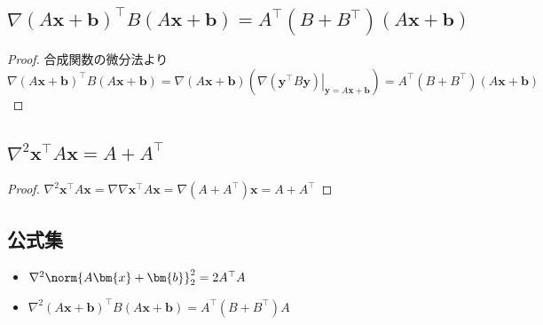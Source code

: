         \subsection{\texorpdfstring{$\nabla (A\bm{x}+\bm{b})^\top B(A\bm{x}+\bm{b}) = A^\top(B+B^\top)(A\bm{x}+\bm{b})$}{∇ (Ax+b)\string^⊤ B(Ax+b) = A\string^⊤ (B+B\string^⊤)(Ax+b)}}
            \begin{proof}
                \quad\par
                合成関数の微分法より
                \[ \nabla (A\bm{x}+\bm{b})^\top B(A\bm{x}+\bm{b}) = \nabla(A\bm{x} + \bm{b})\left(\left.\nabla(\bm{y}^\top B\bm{y})\right|_{\bm{y}=A\bm{x}+\bm{b}}\right) = A^\top(B+B^\top)(A\bm{x}+\bm{b}) \]
            \end{proof}
        \subsection{\texorpdfstring{$\nabla^2 \bm{x}^\top A\bm{x} = A+A^\top$}{∇\string^2 x\string^⊤ Ax = A+A\string^⊤}}
            \begin{proof}
                \quad $\nabla^2\bm{x}^\top A\bm{x} = \nabla \nabla\bm{x}^\top A\bm{x} = \nabla(A+A^\top)\bm{x} = A+A^\top$
            \end{proof}
        \subsection{公式集}
            \begin{itemize}
                \item $\nabla^2 \norm{A\bm{x}+\bm{b}}_2^2 = 2A^\top A$
                \item $\nabla^2 (A\bm{x}+\bm{b})^\top B(A\bm{x}+\bm{b}) = A^\top(B+B^\top)A$
            \end{itemize}
